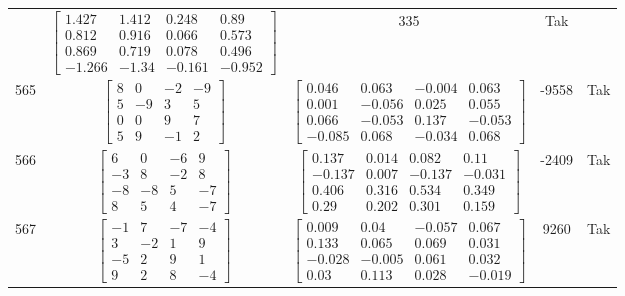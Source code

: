 \documentclass[a4paper,12pt]{article}
\begin{document}
\begin{tabular}{c c c c c}
&
$\begin{bmatrix} 1.427 & 1.412 & 0.248 & 0.89 \\ 0.812 & 0.916 & 0.066 & 0.573 \\ 0.869 & 0.719 & 0.078 & 0.496 \\ -1.266 & -1.34 & -0.161 & -0.952 \end{bmatrix}$
&
335
&
Tak
\\
565
&
$\begin{bmatrix} 8 & 0 & -2 & -9 \\ 5 & -9 & 3 & 5 \\ 0 & 0 & 9 & 7 \\ 5 & 9 & -1 & 2 \end{bmatrix}$
&
$\begin{bmatrix} 0.046 & 0.063 & -0.004 & 0.063 \\ 0.001 & -0.056 & 0.025 & 0.055 \\ 0.066 & -0.053 & 0.137 & -0.053 \\ -0.085 & 0.068 & -0.034 & 0.068 \end{bmatrix}$
&
-9558
&
Tak
\\
566
&
$\begin{bmatrix} 6 & 0 & -6 & 9 \\ -3 & 8 & -2 & 8 \\ -8 & -8 & 5 & -7 \\ 8 & 5 & 4 & -7 \end{bmatrix}$
&
$\begin{bmatrix} 0.137 & 0.014 & 0.082 & 0.11 \\ -0.137 & 0.007 & -0.137 & -0.031 \\ 0.406 & 0.316 & 0.534 & 0.349 \\ 0.29 & 0.202 & 0.301 & 0.159 \end{bmatrix}$
&
-2409
&
Tak
\\
567
&
$\begin{bmatrix} -1 & 7 & -7 & -4 \\ 3 & -2 & 1 & 9 \\ -5 & 2 & 9 & 1 \\ 9 & 2 & 8 & -4 \end{bmatrix}$
&
$\begin{bmatrix} 0.009 & 0.04 & -0.057 & 0.067 \\ 0.133 & 0.065 & 0.069 & 0.031 \\ -0.028 & -0.005 & 0.061 & 0.032 \\ 0.03 & 0.113 & 0.028 & -0.019 \end{bmatrix}$
&
9260
&
Tak
\\

\end{tabular}
\end{document}
